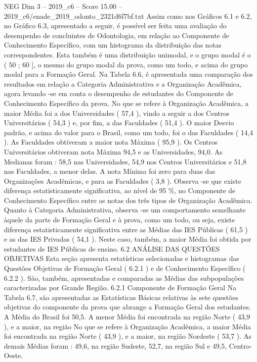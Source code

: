\begin{textsample}{NEG Dim 3 – 2019\_c6 – Score 15.00 – 2019\_c6/enade\_2019\_odonto\_2321d6f7bf.txt}
Assim como nos Gráficos 6.1 e 6.2, no Gráfico 6.3, apresentado a seguir, é possível ser feita uma avaliação do desempenho de concluintes de Odontologia, em relação ao Componente de Conhecimento Específico, com um histograma da distribuição das notas correspondentes.
Esta também é uma distribuição unimodal, e o grupo modal é o ( 50 ; 60 ], o mesmo do grupo modal da prova, como um todo, e acima do grupo modal para a Formação Geral.
Na Tabela 6.6, é apresentada uma comparação dos resultados em relação a Categoria Administrativa e a Organização Acadêmica, agora levando -se em conta o desempenho de estudantes do Componente de Conhecimento Específico da prova.
No que se refere à Organização Acadêmica, a maior Média foi a dos Universidades ( 57,4 ), vindo a seguir a dos Centros Universitários ( 54,3 ) e, por fim, a das Faculdades ( 51,4 ).
O maior Desvio padrão, e acima do valor para o Brasil, como um todo, foi o das Faculdades ( 14,4 ).
As Faculdades obtiveram a maior nota Máxima ( 95,9 ).
Os Centros Universitários obtiveram nota Máxima 94,5 e as Universidades, 94,0.
As Medianas foram : 58,5 nas Universidades, 54,9 nos Centros Universitários e 51,8 nas Faculdades, a menor delas.
A nota Mínima foi zero para duas das Organizações Acadêmicas, e para as Faculdades ( 3,8 ).
Observa -se que existe diferença estatisticamente significativa, ao nível de 95 \%, no Componente de Conhecimento Específico entre as notas dos três tipos de Organização Acadêmica.
Quanto à Categoria Administrativa, observa -se um comportamento semelhante àquele da parte de Formação Geral e à prova, como um todo, ou seja, existe diferença estatisticamente significativa entre as Médias das IES Públicas ( 61,5 ) e as das IES Privadas ( 54,1 ).
Neste caso, também, a maior Média foi obtida por estudantes de IES Públicas de ensino. 6.2 ANÁLISE DAS QUESTÕES OBJETIVAS Esta seção apresenta estatísticas selecionadas e histogramas das Questões Objetivas de Formação Geral ( 6.2.1 ) e de Conhecimento Específico ( 6.2.2 ).
São, também, apresentadas e comparadas as Médias das subpopulações caracterizadas por Grande Região. 6.2.1 Componente de Formação Geral Na Tabela 6.7, são apresentadas as Estatísticas Básicas relativas às sete questões objetivas do componente da prova que abrange a Formação Geral dos estudantes.
A Média do Brasil foi 50,5.
A menor Média foi encontrada na região Norte ( 43,9 ), e a maior, na região No que se refere à Organização Acadêmica, a maior Média foi encontrada na região Norte ( 43,9 ), e a maior, na região Nordeste ( 53,7 ).
As demais Médias foram : 49,6, na região Sudeste, 52,7, na região Sul e 49,5, Centro-Oeste.

\end{textsample}
